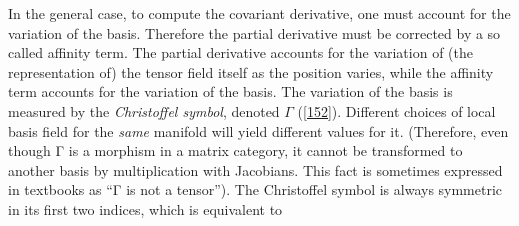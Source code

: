 \documentclass[nolinenum]{jfp}
\begin{document}
In the general case, to compute the covariant derivative, one must account for
the variation of the basis.
Therefore the partial derivative must be corrected by a so called affinity term.
The partial derivative accounts for the variation of (the representation of) the tensor field itself
as the position varies, while the affinity term accounts for the variation
of the basis.
The variation of the basis is measured by the \emph{Christoffel symbol},
denoted \(Γ\) (\cref{152}). Different choices of local basis field for the
\emph{same} manifold will yield different values for it.
(Therefore, even though Γ is a morphism in a matrix category, it cannot be transformed to another basis by multiplication with Jacobians.  This fact is sometimes expressed in textbooks as ``Γ is not a tensor'').
The Christoffel symbol is always symmetric in its first two indices, which is equivalent to
\end{document}
